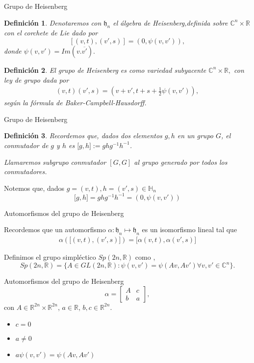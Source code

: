 \documentclass{beamer}
\newtheorem{definicion}{Definición}
\begin{document}
\begin{frame}{Grupo de Heisenberg}
\begin{definicion}
Denotaremos con $\mathfrak{h}_n$ el álgebra de Heisenberg,definida sobre
$\mathbb{C}^n \times \mathbb{R}$  con el corchete de Lie dado por 
$$
[(v,t),(v',s)]=(0,\psi(v,v')),
$$
donde  $\psi (v,v')=Im(v.\overline{v'}).$
\end{definicion} 

\begin{definicion}
El grupo de Heisenberg es como variedad subyacente $\mathbb{C}^{n}\times \mathbb{R},$ con
ley de grupo dada por 
$$\begin{aligned}
(v,t)(v',s)=(v+v',t+s+ \frac{1}{2} \psi(v,v')),
\end{aligned}$$
según la fórmula de Baker-Campbell-Hausdorff.
\end{definicion}
\end{frame}


\begin{frame}{Grupo de Heisenberg}
\begin{definicion}
 Recordemos que, dados dos elementos $g,h$ en un grupo $G$, el conmutador de $g$ y $h$ es ${[}g,h{]}:=g h g^{-1} h^{-1}$.
 
 Llamaremos subgrupo conmutador $[G,G]$ al grupo generado por todos los conmutadores.
\end{definicion}
Notemos que, dados $g=(v,t),h=(v',s) \in \mathbb{H}_n$
$$
{[}g,h{]}=g h g^{-1} h^{-1}=(0,\psi(v,v'))
$$
\end{frame}

\begin{frame}{Automorfismos del grupo de Heisenberg}
 \begin{definition}
 Recordemos que un automorfismo $\alpha: \mathfrak{h}_n \mapsto \mathfrak{h}_n$ es un isomorfismo lineal tal que 
 $$\begin{aligned}
    \alpha({[}(v,t),(v',s){]})={[}\alpha(v,t),\alpha(v',s){]}
 \end{aligned}$$
\end{definition}
\begin{definition}
 Definimos el grupo simpléctico $Sp(2n,\mathbb{R})$ como ,
 $$
 Sp(2n,\mathbb{R})=\{ A \in GL(2n,\mathbb{R}): \psi(v,v')=\psi(Av,Av') \forall v,v' \in \mathbb{C}^n\}.
 $$
\end{definition}

\end{frame}

\begin{frame}{Automorfismos del grupo de Heisenberg}
$$\alpha=
\begin{bmatrix}
A & c\\
b & a
\end{bmatrix},$$
con $A \in  \mathbb{R}^{2n} \times \mathbb{R}^{2n}$, $a \in \mathbb{R}$, $b,c \in \mathbb{R}^{2n}$.

\begin{itemize}
\item <2-> $c=0$
\item <2-> $a\neq0$
\item <2-> $a \psi(v,v')=\psi(A v,A v')$
\end{itemize}
\end{frame}
\end{document}
